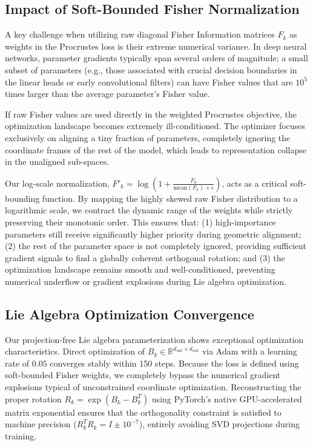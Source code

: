 \documentclass{article}
\theoremstyle{plain}
\theoremstyle{definition}
\theoremstyle{remark}
\begin{document}
\subsection{Impact of Soft-Bounded Fisher Normalization}
A key challenge when utilizing raw diagonal Fisher Information matrices $F_k$ as weights in the Procrustes loss is their extreme numerical variance. In deep neural networks, parameter gradients typically span several orders of magnitude; a small subset of parameters (e.g., those associated with crucial decision boundaries in the linear heads or early convolutional filters) can have Fisher values that are $10^5$ times larger than the average parameter's Fisher value. 

If raw Fisher values are used directly in the weighted Procrustes objective, the optimization landscape becomes extremely ill-conditioned. The optimizer focuses exclusively on aligning a tiny fraction of parameters, completely ignoring the coordinate frames of the rest of the model, which leads to representation collapse in the unaligned sub-spaces.

Our log-scale normalization, $F'_k = \log \left( 1 + \frac{F_k}{\text{mean}(F_k) + \epsilon} \right)$, acts as a critical soft-bounding function. By mapping the highly skewed raw Fisher distribution to a logarithmic scale, we contract the dynamic range of the weights while strictly preserving their monotonic order. This ensures that: (1) high-importance parameters still receive significantly higher priority during geometric alignment; (2) the rest of the parameter space is not completely ignored, providing sufficient gradient signals to find a globally coherent orthogonal rotation; and (3) the optimization landscape remains smooth and well-conditioned, preventing numerical underflow or gradient explosions during Lie algebra optimization.

\subsection{Lie Algebra Optimization Convergence}
Our projection-free Lie algebra parameterization shows exceptional optimization characteristics. Direct optimization of $B_k \in \mathbb{R}^{d_{out} \times d_{out}}$ via Adam with a learning rate of $0.05$ converges stably within 150 steps. Because the loss is defined using soft-bounded Fisher weights, we completely bypass the numerical gradient explosions typical of unconstrained coordinate optimization. Reconstructing the proper rotation $R_k = \exp(B_k - B_k^T)$ using PyTorch's native GPU-accelerated matrix exponential ensures that the orthogonality constraint is satisfied to machine precision ($R_k^T R_k = I \pm 10^{-7}$), entirely avoiding SVD projections during training.
\end{document}
